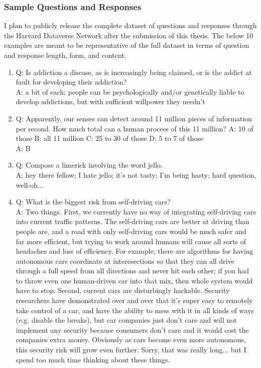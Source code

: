 \subsubsection{Sample Questions and Responses}

I plan to publicly release the complete dataset of questions and responses through the Harvard Dataverse Network after the submission of this thesis. The below 10 examples are meant to be representative of the full dataset in terms of question and response length, form, and content.

\begin{enumerate}

\item Q: Is addiction a disease, as is increasingly being claimed, or is the addict at fault for developing their addiction?
\\ A: a bit of each; people can be psychologically and/or genetically liable to develop addictions, but with sufficient willpower they needn't

\item Q: Apparently, our senses can detect around 11 million pieces of information per second. How much total can a human process of this 11 million? A: 10 of those B: all 11 million C: 25 to 30 of those D: 5 to 7 of those
\\ A: B

\item Q: Compose a limerick involving the word jello.
\\ A: hey there fellow; I hate jello; it's not tasty; I'm being hasty; hard question, well-oh...

\item Q: What is the biggest risk from self-driving cars?
\\ A: Two things.  First, we currently have no way of integrating self-driving cars into current traffic patterns.  The self-driving cars are better at driving than people are, and a road with only self-driving cars would be much safer and far more efficient, but trying to work around humans will cause all sorts of headaches and loss of efficiency.  For example, there are algorithms for having autonomous cars coordinate at interesections so that they can all drive through a full speed from all directions and never hit each other; if you had to throw even one human-driven car into that mix, then whole system would have to stop.  Second, current cars are disturbingly hackable.  Security researchers have demonstrated over and over that it's super easy to remotely take control of a car, and have the ability to mess with it in all kinds of ways (e.g. disable the breaks), but car companies just don't care and will not implement any security because consumers don't care and it would cost the companies extra money.  Obviously as cars become even more autonomous, this security risk will grow even further.  Sorry, that was really long... but I spend too much time thinking about these things.


\end{enumerate}

